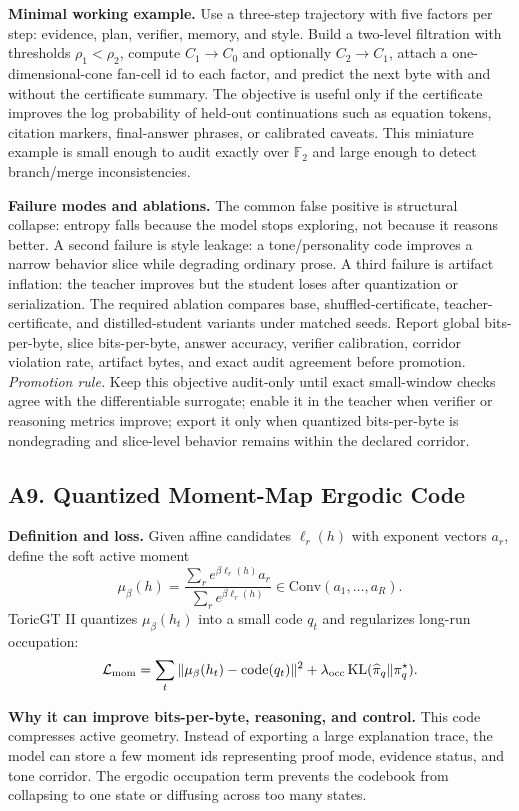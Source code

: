 \documentclass[10pt]{article}
\newcommand{\FF}{\mathbb{F}}
\newcommand{\KL}{\operatorname{KL}}
\newcommand{\loss}{\mathcal{L}}
\numberwithin{equation}{section}
\begin{document}
\noindent\textbf{Minimal working example.} Use a three-step trajectory with five factors per step: evidence, plan, verifier, memory, and style. Build a two-level filtration with thresholds $\rho_1<\rho_2$, compute $C_1\to C_0$ and optionally $C_2\to C_1$, attach a one-dimensional-cone fan-cell id to each factor, and predict the next byte with and without the certificate summary. The objective is useful only if the certificate improves the log probability of held-out continuations such as equation tokens, citation markers, final-answer phrases, or calibrated caveats. This miniature example is small enough to audit exactly over $\FF_2$ and large enough to detect branch/merge inconsistencies.

\noindent\textbf{Failure modes and ablations.} The common false positive is structural collapse: entropy falls because the model stops exploring, not because it reasons better. A second failure is style leakage: a tone/personality code improves a narrow behavior slice while degrading ordinary prose. A third failure is artifact inflation: the teacher improves but the student loses after quantization or serialization. The required ablation compares base, shuffled-certificate, teacher-certificate, and distilled-student variants under matched seeds. Report global bits-per-byte, slice bits-per-byte, answer accuracy, verifier calibration, corridor violation rate, artifact bytes, and exact audit agreement before promotion.
\vfill
\noindent\emph{Promotion rule.} Keep this objective audit-only until exact small-window checks agree with the differentiable surrogate; enable it in the teacher when verifier or reasoning metrics improve; export it only when quantized bits-per-byte is nondegrading and slice-level behavior remains within the declared corridor.
\clearpage
\subsection{A9. Quantized Moment-Map Ergodic Code}
\noindent\textbf{Definition and loss.} Given affine candidates $\ell_r(h)$ with exponent vectors $a_r$, define the soft active moment
\[
\mu_\beta(h)=\frac{\sum_r e^{\beta\ell_r(h)}a_r}{\sum_r e^{\beta\ell_r(h)}}\in\mathrm{Conv}(a_1,\ldots,a_R).
\]
ToricGT II quantizes $\mu_\beta(h_t)$ into a small code $q_t$ and regularizes long-run occupation:
\[
\loss_{\rm mom}=\sum_t\|\mu_\beta(h_t)-\mathrm{code}(q_t)\|^2+\lambda_{\rm occ}\KL(\widehat\pi_q\|\pi_q^\star).
\]

\noindent\textbf{Why it can improve bits-per-byte, reasoning, and control.} This code compresses active geometry. Instead of exporting a large explanation trace, the model can store a few moment ids representing proof mode, evidence status, and tone corridor. The ergodic occupation term prevents the codebook from collapsing to one state or diffusing across too many states.
\end{document}
